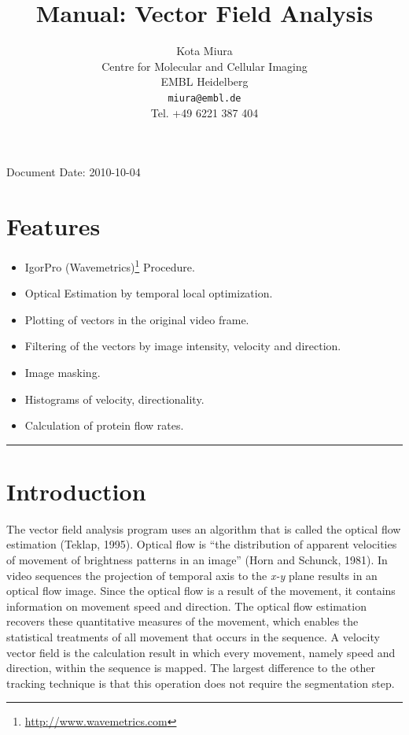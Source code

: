 \documentclass{article}
\begin{document}
\title{Manual: Vector Field Analysis}
\author{Kota Miura\\
Centre for Molecular and Cellular Imaging\\
EMBL Heidelberg\\
 \texttt{miura@embl.de}\\
Tel. +49 6221 387 404
}

\maketitle


Document Date: 2010-10-04

\tableofcontents

\section{Features}\label{features}

\begin{itemize}
\item
  IgorPro (Wavemetrics)\footnote{\url{http://www.wavemetrics.com}}
  Procedure.
\item
  Optical Estimation by temporal local optimization.
\item
  Plotting of vectors in the original video frame.
\item
  Filtering of the vectors by image intensity, velocity and direction.
\item
  Image masking.
\item
  Histograms of velocity, directionality.
\item
  Calculation of protein flow rates.
\end{itemize}

\begin{center}\rule{0.5\linewidth}{\linethickness}\end{center}

\section{Introduction}\label{introduction}

The vector field analysis program uses an algorithm that is called the
optical flow estimation (Teklap, 1995). Optical flow is ``the
distribution of apparent velocities of movement of brightness patterns
in an image'' (Horn and Schunck, 1981). In video sequences the
projection of temporal axis to the \emph{x-y} plane results in an
optical flow image. Since the optical flow is a result of the movement,
it contains information on movement speed and direction. The optical
flow estimation recovers these quantitative measures of the movement,
which enables the statistical treatments of all movement that occurs in
the sequence. A velocity vector field is the calculation result in which
every movement, namely speed and direction, within the sequence is
mapped. The largest difference to the other tracking technique is that
this operation does not require the segmentation step.
\end{document}
